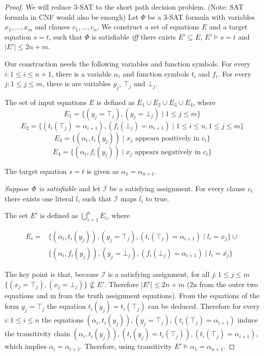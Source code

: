 \begin{proof}

We will reduce 3-SAT to the short path decision problem. (Note: SAT formula in CNF would also be enough)
Let $\Phi$ be a 3-SAT formula with variables $x_1,\ldots,x_m$ and clauses $c_1,\ldots,c_n$.
We construct a set of equations $E$ and a target equation $s = t$, 
such that $\Phi$ is satisfiable \emph{iff} there exists $E' \subseteq E$, $E' \models s = t$ and $|E'| \leq 2n + m$.

Our construction needs the following variables and function symbols.
For every $i: 1 \leq i \leq n + 1$, there is a variable $\alpha_i$ and function symbols $t_i$ and $f_i$.
For every $j: 1 \leq j \leq m$, there is are variables $y_j$, $\top_j$ and $\bot_j$.

The set of input equations $E$ is defined as $E_1 \cup E_2 \cup E_3 \cup E_4$, where
$$E_1 = \{ (y_j = \top_j), (y_j = \bot_j) \mid 1 \leq j \leq m\}$$
$$E_2 = \{ (t_i(\top_j) = \alpha_{i+1}),(f_i(\bot_j) = \alpha_{i+1}) \mid 1 \leq i \leq n, 1 \leq j \leq m\}$$
$$E_3 = \{ (\alpha_i, t_i(y_j)) \mid x_j \text{ appears positively in } c_i\}$$
$$E_4 = \{ (\alpha_i, f_i(y_j)) \mid x_j \text{ appears negatively in } c_i\}$$

The target equation $s = t$ is given as $\alpha_1 = \alpha_{n+1}$.

\emph{Suppose $\Phi$ is satisfiable} and let $\mathcal{I}$ be a satisfying assignment.
For every clause $c_i$ there exists one literal $l_i$ such that $\mathcal{I}$ maps $l_i$ to true.

The set $E'$ is defined as $\bigcup_{i = 1}^{n}{E_i}$, where

\begin{align*}
E_i = &\{ (\alpha_i,t_i(y_j)),(y_j = \top_j),(t_i(\top_j) = \alpha_{i+1}) \mid l_i = x_j\} \cup \\
& \{ (\alpha_i,f_i(y_j)),(y_j = \bot_j),(f_i(\bot_j) = \alpha_{i+1}) \mid l_i = \bar{x_j}\}
\end{align*}

The key point is that, because $\mathcal{I}$ is a satisfying assignment, for all $j: 1 \leq j \leq m$ \\ $\{(x_j = \top_j),(x_j = \bot_j)\} \nsubseteq E'$.
Therefore $|E'| \leq 2n + m$ (2n from the outer two equations and m from the truth assignment equations).
From the equations of the form $y_j = \top_j$ the equation $t_i(y_j) = t_i(\top_j)$ can be deduced.
Therefore for every $i: 1 \leq i \leq n$ the equations $(\alpha_i,t_i(y_j)),(y_j = \top_j),(t_i(\top_j) = \alpha_{i+1})$ induce the transitivity chain $(\alpha_i,t_i(y_j)),(t_i(y_j) = t_i(\top_j)),(t_i(\top_j) = \alpha_{i+1})$, which implies $\alpha_i = \alpha_{i+1}$. Therefore, using transitivity $E' \models \alpha_1 = \alpha_{n+1}$.



\end{proof}
